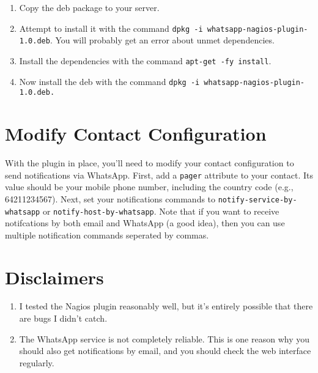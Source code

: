 \documentclass{article}   	%
\begin{document}
\begin{enumerate}
  \item Copy the deb package to your server.
  \item Attempt to install it with the command \texttt{dpkg -i whatsapp-nagios-plugin-1.0.deb}.  You will probably get an error about unmet dependencies.
  \item Install the dependencies with the command \texttt{apt-get -fy install}.
  \item Now install the deb with the command \texttt{dpkg -i whatsapp-nagios-plugin-1.0.deb.}
\end{enumerate}

\section{Modify Contact Configuration}
With the plugin in place, you'll need to modify your contact configuration to send notifications via WhatsApp.  First, add a \texttt{pager} attribute to your contact.  Its value should be your mobile phone number, including the country code (e.g., 64211234567). Next, set your notifications commands to \texttt{notify-service-by-whatsapp} or \texttt{notify-host-by-whatsapp}.  Note that if you want to receive notifcations by both email and WhatsApp (a good idea), then you can use multiple notification commands seperated by commas.


\section{Disclaimers}

\begin{enumerate}
 \item I tested the Nagios plugin reasonably well, but it's entirely possible that there are bugs I didn't catch.
 \item The WhatsApp service is not completely reliable.  This is one reason why you should also get notifications by email, and you should check the web interface regularly.
\end{enumerate}
\end{document}
